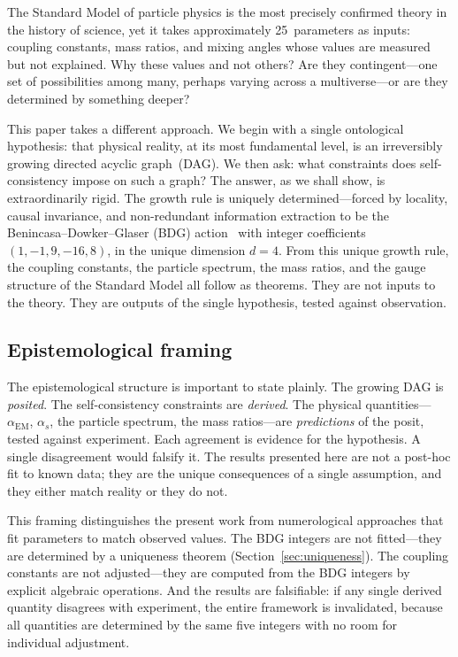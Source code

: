 \documentclass[12pt,a4paper]{article}
\begin{document}
The Standard Model of particle physics is the most precisely confirmed theory in the history of science, yet it takes approximately 25~parameters as inputs: coupling constants, mass ratios, and mixing angles whose values are measured but not explained. Why these values and not others? Are they contingent---one set of possibilities among many, perhaps varying across a multiverse---or are they determined by something deeper?

This paper takes a different approach. We begin with a single ontological hypothesis: that physical reality, at its most fundamental level, is an irreversibly growing directed acyclic graph~(DAG). We then ask: what constraints does self-consistency impose on such a graph? The answer, as we shall show, is extraordinarily rigid. The growth rule is uniquely determined---forced by locality, causal invariance, and non-redundant information extraction to be the Benincasa--Dowker--Glaser (BDG) action~\cite{BenincasaDowker2010,DowkerGlaser2013,Glaser2014} with integer coefficients $(1,-1,9,-16,8)$, in the unique dimension $d=4$. From this unique growth rule, the coupling constants, the particle spectrum, the mass ratios, and the gauge structure of the Standard Model all follow as theorems. They are not inputs to the theory. They are outputs of the single hypothesis, tested against observation.

\subsection{Epistemological framing}\label{sec:epistemology}

The epistemological structure is important to state plainly. The growing DAG is \emph{posited}. The self-consistency constraints are \emph{derived}. The physical quantities---$\alpha_{\mathrm{EM}}$, $\alpha_s$, the particle spectrum, the mass ratios---are \emph{predictions} of the posit, tested against experiment. Each agreement is evidence for the hypothesis. A single disagreement would falsify it. The results presented here are not a post-hoc fit to known data; they are the unique consequences of a single assumption, and they either match reality or they do not.

This framing distinguishes the present work from numerological approaches that fit parameters to match observed values. The BDG integers are not fitted---they are determined by a uniqueness theorem (Section~\ref{sec:uniqueness}). The coupling constants are not adjusted---they are computed from the BDG integers by explicit algebraic operations. And the results are falsifiable: if any single derived quantity disagrees with experiment, the entire framework is invalidated, because all quantities are determined by the same five integers with no room for individual adjustment.
\end{document}
